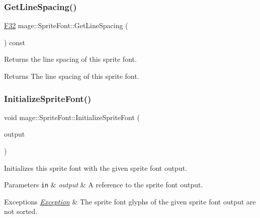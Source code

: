 \subsubsection{\texorpdfstring{Get\+Line\+Spacing()}{GetLineSpacing()}}
{\footnotesize\ttfamily \hyperlink{namespacemage_aa97e833b45f06d60a0a9c4fc22ae02c0}{F32} mage\+::\+Sprite\+Font\+::\+Get\+Line\+Spacing (\begin{DoxyParamCaption}{ }\end{DoxyParamCaption}) const\hspace{0.3cm}{\ttfamily [noexcept]}}

Returns the line spacing of this sprite font.

\begin{DoxyReturn}{Returns}
The line spacing of this sprite font. 
\end{DoxyReturn}
\hypertarget{classmage_1_1_sprite_font_ae0edccbf98f4bd3b3195fa602baee121}{}\label{classmage_1_1_sprite_font_ae0edccbf98f4bd3b3195fa602baee121} 
\subsubsection{\texorpdfstring{Initialize\+Sprite\+Font()}{InitializeSpriteFont()}}
{\footnotesize\ttfamily void mage\+::\+Sprite\+Font\+::\+Initialize\+Sprite\+Font (\begin{DoxyParamCaption}\item[{const \hyperlink{structmage_1_1_sprite_font_output}{Sprite\+Font\+Output} \&}]{output }\end{DoxyParamCaption})\hspace{0.3cm}{\ttfamily [private]}}

Initializes this sprite font with the given sprite font output.


\begin{DoxyParams}[1]{Parameters}
\mbox{\tt in}  & {\em output} & A reference to the sprite font output. \\
\hline
\end{DoxyParams}

\begin{DoxyExceptions}{Exceptions}
{\em \hyperlink{classmage_1_1_exception}{Exception}} & The sprite font glyphs of the given sprite font output are not sorted. \\
\hline
\end{DoxyExceptions}
\hypertarget{classmage_1_1_sprite_font_af0c58192fcf484c008ee17e79cab3f4e}{}\label{classmage_1_1_sprite_font_af0c58192fcf484c008ee17e79cab3f4e} 
